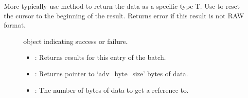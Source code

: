 \documentclass[letterpaper,10pt,english]{sphinxmanual}
\begin{document}
\begin{fulllineitems}
\begin{fulllineitems}
More typically use {\hyperref[\detokenize{cpp_api/classnvidia_1_1inferenceserver_1_1client_1_1InferContext_1_1Result:classnvidia_1_1inferenceserver_1_1client_1_1InferContext_1_1Result_1a2a13887812b025896d569f041db7e2c8}]{}} method to return the data as a specific type T. Use {\hyperref[\detokenize{cpp_api/classnvidia_1_1inferenceserver_1_1client_1_1InferContext_1_1Result:classnvidia_1_1inferenceserver_1_1client_1_1InferContext_1_1Result_1adb27437d415b569a3a4b7700c56002bf}]{}} to reset the cursor to the beginning of the result. Returns error if this result is not RAW format. \begin{description}
\item[{}] \leavevmode
{\hyperref[\detokenize{cpp_api/classnvidia_1_1inferenceserver_1_1client_1_1Error:classnvidia_1_1inferenceserver_1_1client_1_1Error}]{}} object indicating success or failure. 

\item[{}] \leavevmode\begin{itemize}
\item {} 
: Returns results for this entry of the batch. 

\item {} 
: Returns pointer to ‘adv\_byte\_size’ bytes of data. 

\item {} 
: The number of bytes of data to get a reference to. 

\end{itemize}

\end{description}


\end{fulllineitems}



\end{fulllineitems}
\end{document}
